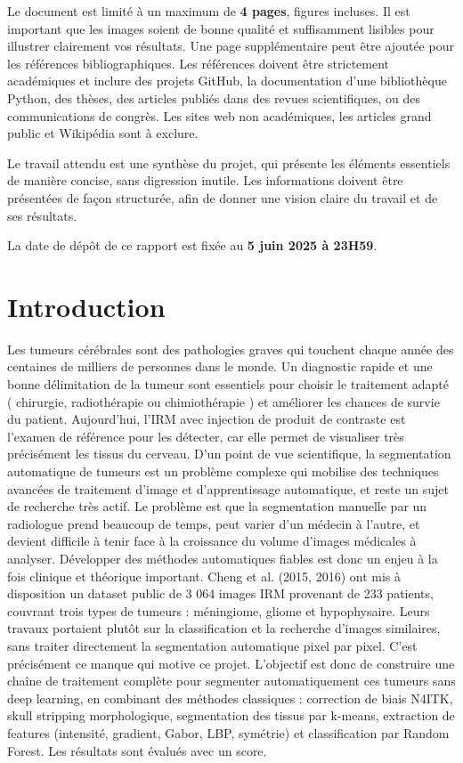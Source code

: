 \documentclass[conference]{IEEEtran}
\begin{document}
Le document est limité à un maximum de \textbf{4 pages}, figures incluses. Il est important que les images soient de bonne qualité et suffisamment lisibles pour illustrer clairement vos résultats. Une page supplémentaire peut être ajoutée pour les références bibliographiques. Les références doivent être strictement académiques et inclure des projets GitHub, la documentation d'une bibliothèque Python, des thèses, des articles publiés dans des revues scientifiques, ou des communications de congrès. Les sites web non académiques, les articles grand public et Wikipédia sont à exclure.

Le travail attendu est une synthèse du projet, qui présente les éléments essentiels de manière concise, sans digression inutile. Les informations doivent être présentées de façon structurée, afin de donner une vision claire du travail et de ses résultats.

La date de dépôt de ce rapport est fixée au \textbf{5 juin 2025 à 23H59}.

\section{Introduction}

Les tumeurs cérébrales sont des pathologies graves qui touchent chaque année des centaines de milliers de personnes dans le monde. Un diagnostic rapide et une bonne délimitation de la tumeur sont essentiels pour choisir le traitement adapté ( chirurgie, radiothérapie ou chimiothérapie ) et améliorer les chances de survie du patient. Aujourd'hui, l'IRM avec injection de produit de contraste est l'examen de référence pour les détecter, car elle permet de visualiser très précisément les tissus du cerveau. D'un point de vue scientifique, la segmentation automatique de tumeurs est un problème complexe qui mobilise des techniques avancées de traitement d'image et d'apprentissage automatique, et reste un sujet de recherche très actif.
Le problème est que la segmentation manuelle par un radiologue prend beaucoup de temps, peut varier d'un médecin à l'autre, et devient difficile à tenir face à la croissance du volume d'images médicales à analyser. Développer des méthodes automatiques fiables est donc un enjeu à la fois clinique et théorique important.
Cheng et al. (2015, 2016) ont mis à disposition un dataset public de 3 064 images IRM provenant de 233 patients, couvrant trois types de tumeurs : méningiome, gliome et hypophysaire. Leurs travaux portaient plutôt sur la classification et la recherche d'images similaires, sans traiter directement la segmentation automatique pixel par pixel. C'est précisément ce manque qui motive ce projet.
L'objectif est donc de construire une chaîne de traitement complète pour segmenter automatiquement ces tumeurs sans deep learning, en combinant des méthodes classiques : correction de biais N4ITK, skull stripping morphologique, segmentation des tissus par k-means, extraction de features (intensité, gradient, Gabor, LBP, symétrie) et classification par Random Forest. Les résultats sont évalués avec un score.
\end{document}
